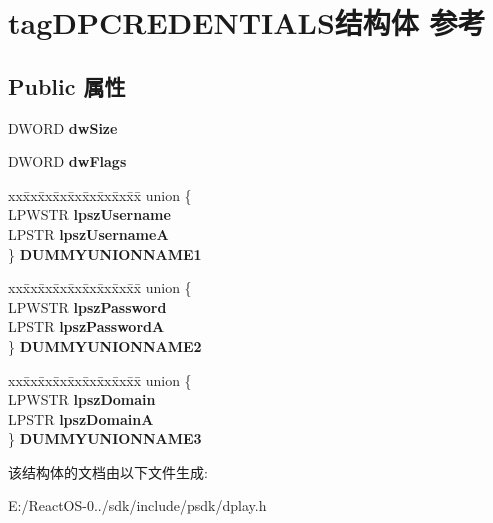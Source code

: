 \hypertarget{structtag_d_p_c_r_e_d_e_n_t_i_a_l_s}{}\section{tag\+D\+P\+C\+R\+E\+D\+E\+N\+T\+I\+A\+L\+S结构体 参考}
\label{structtag_d_p_c_r_e_d_e_n_t_i_a_l_s}
\subsection*{Public 属性}
\begin{DoxyCompactItemize}
\item 
\mbox{\label{structtag_d_p_c_r_e_d_e_n_t_i_a_l_s_a91f6027631991c334e67365fe3894d51}} 
D\+W\+O\+RD {\bfseries dw\+Size}
\item 
\mbox{\label{structtag_d_p_c_r_e_d_e_n_t_i_a_l_s_a515b62cc7177d3a45199a6d30a6cf2fd}} 
D\+W\+O\+RD {\bfseries dw\+Flags}
\item 
\mbox{\label{structtag_d_p_c_r_e_d_e_n_t_i_a_l_s_a434869ba4b325b6ab8e7da49021fe7df}} 
\begin{tabbing}
xx\=xx\=xx\=xx\=xx\=xx\=xx\=xx\=xx\=\kill
union \{\\
\>LPWSTR {\bfseries lpszUsername}\\
\>LPSTR {\bfseries lpszUsernameA}\\
\} {\bfseries DUMMYUNIONNAME1}\\

\end{tabbing}\item 
\mbox{\label{structtag_d_p_c_r_e_d_e_n_t_i_a_l_s_a9255fd078fbb45e2daf8d729b5378422}} 
\begin{tabbing}
xx\=xx\=xx\=xx\=xx\=xx\=xx\=xx\=xx\=\kill
union \{\\
\>LPWSTR {\bfseries lpszPassword}\\
\>LPSTR {\bfseries lpszPasswordA}\\
\} {\bfseries DUMMYUNIONNAME2}\\

\end{tabbing}\item 
\mbox{\label{structtag_d_p_c_r_e_d_e_n_t_i_a_l_s_abd7313af5e427c5bc0b431cbfd55857a}} 
\begin{tabbing}
xx\=xx\=xx\=xx\=xx\=xx\=xx\=xx\=xx\=\kill
union \{\\
\>LPWSTR {\bfseries lpszDomain}\\
\>LPSTR {\bfseries lpszDomainA}\\
\} {\bfseries DUMMYUNIONNAME3}\\

\end{tabbing}\end{DoxyCompactItemize}


该结构体的文档由以下文件生成\+:\begin{DoxyCompactItemize}
\item 
E\+:/\+React\+O\+S-\/0../sdk/include/psdk/dplay.\+h\end{DoxyCompactItemize}
